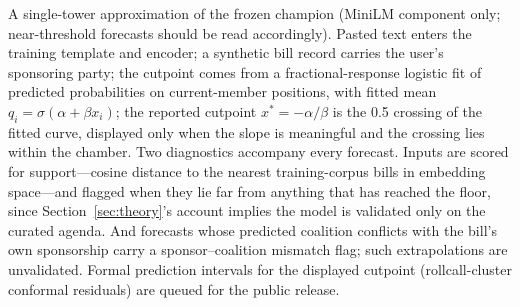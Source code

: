 \documentclass[12pt]{article}
\begin{document}
A single-tower approximation of the frozen champion (MiniLM component
only; near-threshold forecasts should be read accordingly). Pasted
text enters the training template and encoder; a synthetic bill
record carries the user's sponsoring party; the cutpoint comes from a
fractional-response logistic fit of predicted probabilities on
current-member positions, with fitted mean $q_i =
\sigma(\alpha + \beta x_i)$; the reported cutpoint $x^* =
-\alpha/\beta$ is the 0.5 crossing of the fitted curve, displayed
only when the slope is meaningful and the crossing lies within the
chamber. Two diagnostics accompany every forecast. Inputs are scored
for support---cosine distance to the nearest training-corpus bills in
embedding space---and flagged when they lie far from anything that
has reached the floor, since Section~\ref{sec:theory}'s account
implies the model is validated only on the curated agenda. And
forecasts whose predicted coalition conflicts with the bill's own
sponsorship carry a sponsor--coalition mismatch flag; such
extrapolations are unvalidated. Formal prediction intervals for the
displayed cutpoint (rollcall-cluster conformal residuals) are queued
for the public release.
\end{document}
